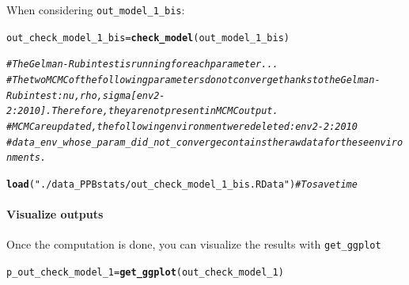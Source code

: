 \documentclass{book}\usepackage[]{graphicx}\usepackage[]{color}
\makeatletter
\newcommand{\hlstr}[1]{\textcolor[rgb]{0.192,0.494,0.8}{#1}}%
\newcommand{\hlcom}[1]{\textcolor[rgb]{0.678,0.584,0.686}{\textit{#1}}}%
\newcommand{\hlstd}[1]{\textcolor[rgb]{0.345,0.345,0.345}{#1}}%
\newcommand{\hlkwb}[1]{\textcolor[rgb]{0.69,0.353,0.396}{#1}}%
\newcommand{\hlkwd}[1]{\textcolor[rgb]{0.737,0.353,0.396}{\textbf{#1}}}%
\newenvironment{kframe}{%
 \def\at@end@of@kframe{}%
 \ifinner\ifhmode%
  \def\at@end@of@kframe{\end{minipage}}%
  \begin{minipage}{\columnwidth}%
 \fi\fi%
 \def\FrameCommand##1{\hskip\@totalleftmargin \hskip-\fboxsep
 \colorbox{shadecolor}{##1}\hskip-\fboxsep
     \hskip-\linewidth \hskip-\@totalleftmargin \hskip\columnwidth}%
 \MakeFramed {\advance\hsize-\width
   \@totalleftmargin\z@ \linewidth\hsize
   \@setminipage}}%
 {\par\unskip\endMakeFramed%
 \at@end@of@kframe}
\newenvironment{knitrout}{}{} %
\makeatother
\begin{document}
When considering \texttt{out\_model\_1\_bis}:
\begin{knitrout}
\color{fgcolor}\begin{kframe}
\begin{alltt}
\hlstd{out_check_model_1_bis} \hlkwb{=} \hlkwd{check_model}\hlstd{(out_model_1_bis)}
\end{alltt}


{\ttfamily\noindent\bfseries\color{errorcolor}{\#\# Error in check\_model(out\_model\_1\_bis): objet 'out\_model\_1\_bis' introuvable}}\begin{alltt}
\hlcom{# The Gelman-Rubin test is running for each parameter ...}
\hlcom{# The two MCMC of the following parameters do not converge thanks to the Gelman-Rubin test : nu, rho, sigma[env2-2:2010]. Therefore, they are not present in MCMC output.}
\hlcom{# MCMC are updated, the following environment were deleted : env2-2:2010}
\hlcom{# data_env_whose_param_did_not_converge contains the raw data for these environments.}

\hlkwd{load}\hlstd{(}\hlstr{"./data_PPBstats/out_check_model_1_bis.RData"}\hlstd{)} \hlcom{# To save time}
\end{alltt}


{\ttfamily\noindent\color{warningcolor}{\#\# Warning in readChar(con, 5L, useBytes = TRUE): impossible d'ouvrir le fichier compressé './data\_PPBstats/out\_check\_model\_1\_bis.RData', cause probable : 'Aucun fichier ou dossier de ce type'}}

{\ttfamily\noindent\bfseries\color{errorcolor}{\#\# Error in readChar(con, 5L, useBytes = TRUE): impossible d'ouvrir la connexion}}\end{kframe}
\end{knitrout}


\paragraph{Visualize outputs}

Once the computation is done, you can visualize the results with \texttt{get\_ggplot}
\begin{knitrout}
\color{fgcolor}\begin{kframe}
\begin{alltt}
\hlstd{p_out_check_model_1} \hlkwb{=} \hlkwd{get_ggplot}\hlstd{(out_check_model_1)}
\end{alltt}


{\ttfamily\noindent\bfseries\color{errorcolor}{\#\# Error in get\_ggplot(out\_check\_model\_1): objet 'out\_check\_model\_1' introuvable}}\end{kframe}
\end{knitrout}
\end{document}
